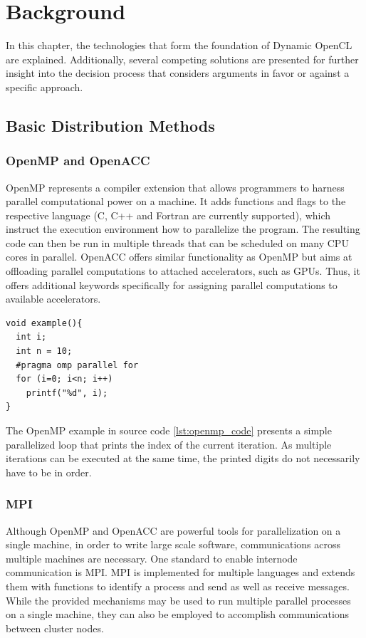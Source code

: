 \chapter{Background}
\label{background}
In this chapter, the technologies that form the foundation of Dynamic OpenCL are explained. Additionally, several competing solutions are presented for further insight into the decision process that considers arguments in favor or against a specific approach.

\section{Basic Distribution Methods}
\label{distribution_basics}

\subsection*{OpenMP and OpenACC}
OpenMP represents a compiler extension that allows programmers to harness parallel computational power on a machine. It adds functions and flags to the respective language (C, C++ and Fortran are currently supported), which instruct the execution environment how to parallelize the program\cite{openmp_spec}. The resulting code can then be run in multiple threads that can be scheduled on many CPU cores in parallel. OpenACC offers similar functionality as OpenMP but aims at offloading parallel computations to attached accelerators, such as GPUs\cite{openacc_spec}. Thus, it offers additional keywords specifically for assigning parallel computations to available accelerators.

\begin{lstlisting}[caption=OpenMP Code Example in C,captionpos=b,label=lst:openmp_code]
void example(){
  int i;
  int n = 10;
  #pragma omp parallel for
  for (i=0; i<n; i++)
    printf("%d", i);
}
\end{lstlisting}

The OpenMP example in source code \ref{lst:openmp_code} presents a simple parallelized loop that prints the index of the current iteration. As multiple iterations can be executed at the same time, the printed digits do not necessarily have to be in order.

\subsection*{MPI}
Although OpenMP and OpenACC are powerful tools for parallelization on a single machine, in order to write large scale software, communications across multiple machines are necessary. One standard to enable internode communication is MPI. MPI is implemented for multiple languages and extends them with functions to identify a process and send as well as receive messages\cite{mpi_spec}. While the provided mechanisms may be used to run multiple parallel processes on a single machine, they can also be employed to accomplish communications between cluster nodes.

